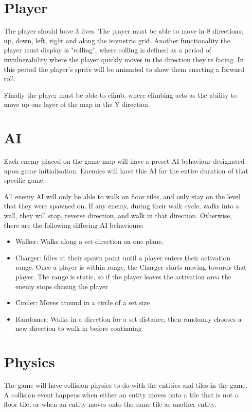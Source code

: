 \documentclass{scrreprt}
\begin{document}
\chapter{Player}
The player should have 3 lives. The player must be able to move in 8 directions; up, down, left, right and along the isometric grid. Another functionality the player must display is "rolling", where rolling is defined as a period of invulnerability where the player quickly moves in the direction they're facing. In this period the player’s sprite will be animated to show them enacting a forward roll.

Finally the player must be able to climb, where climbing acts as the ability to move up one layer of the map in the Y direction. 

\chapter{AI}
Each enemy placed on the game map will have a preset AI behaviour designated upon game initialisation. Enemies will have this AI for the entire duration of that specific game. 

All enemy AI will only be able to walk on floor tiles, and only stay on the level that they were spawned on. If any enemy, during their walk cycle, walks into a wall, they will stop, reverse direction, and walk in that direction. Otherwise, there are the following differing AI behaviours:
\begin{itemize}
\item Walker: Walks along a set direction on one plane.
\item Charger: Idles at their spawn point until a player enters their activation range. Once a player is within range, the Charger starts moving towards that player. The range is static, so if the player leaves the activation area the enemy stops chasing the player
\item Circler: Moves around in a circle of a set size
\item Randomer: Walks in a direction for a set distance, then randomly chooses a new direction to walk in before continuing
\end{itemize}

\chapter{Physics}
The game will have collision physics to do with the entities and tiles in the game. A collision event happens when either an entity moves onto a tile that is not a floor tile, or when an entity moves onto the same tile as another entity.
\end{document}
